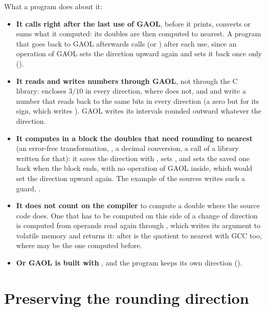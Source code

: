 \medskip
\noindent
What a program does about it:
\begin{itemize}
\item[$\bullet$] \textbf{It calls  right after the last use of
  GAOL}, before it prints, converts or sums what it computed: its doubles are
  then computed to nearest. A program that goes back to GAOL afterwards calls
   (or ) after
  each use, since an operation of GAOL sets the direction upward again and
   sets it back once only ().
\item[$\bullet$] \textbf{It reads and writes numbers through GAOL}, not
  through the C library:  encloses $3/10$ in
  every direction, where  does not, and
   and  write a number that reads back to the
  same bits in every direction (a zero but for its sign, which
   writes ). GAOL writes its intervals
  rounded outward whatever the direction.
\item[$\bullet$] \textbf{It computes in a block the doubles that need rounding
  to nearest} (an error-free transformation, , a decimal
  conversion, a call of a library written for that): it saves the direction
  with , sets , and sets the saved
  one back when the block ends, with no operation of GAOL inside, which would
  set the direction upward again. The example of the sources writes such a
  guard, .
\item[$\bullet$] \textbf{It does not count on the compiler} to compute a
  double where the source code does. One that has to be computed on this side
  of a change of direction is computed from operands read again through
  , which writes its argument to volatile memory
  and returns it: 
  after  is the quotient to nearest with GCC too, where
   may be the one computed before.
\item[$\bullet$] \textbf{Or GAOL is built with
  }, and the program keeps its own direction
  ().
\end{itemize}

\section{Preserving the rounding direction}\label{sec:preserve-rounding}
%
%

